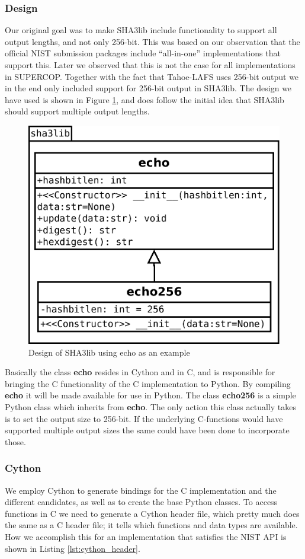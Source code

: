 \documentclass[english,12pt,a4paper]{book}
\begin{document}
\subsubsection{Design}
Our original goal was to make SHA3lib include functionality to support all
output lengths, and not only 256-bit. This was based on our observation that
the official \ac{NIST} submission packages include ``all-in-one''
implementations that support this. Later we observed that this is not the case
for all implementations in \ac{SUPERCOP}. Together with the fact that
Tahoe-\ac{LAFS} uses 256-bit output we in the end only included support for
256-bit output in SHA3lib. The design we have used is shown in Figure
\ref{fig:python:inheritance}, and does follow the initial idea that SHA3lib
should support multiple output lengths.

\begin{figure}[h!]
    \centering
    \includegraphics[width=0.6\columnwidth]{python-inheritance.pdf}
    \caption{Design of SHA3lib using echo as an example}
    \label{fig:python:inheritance}
\end{figure}

Basically the class \textbf{echo} resides in Cython and in C, and is responsible
for bringing the C functionality of the C implementation to Python. By compiling
\textbf{echo} it will be made available for use in Python.  The class
\textbf{echo256} is a simple Python class which inherits from \textbf{echo}. The
only action this class actually takes is to set the output size to 256-bit. If
the underlying C-functions would have supported multiple output sizes the same
could have been done to incorporate those.

\subsubsection{Cython}
We employ Cython to generate bindings for the C implementation and the
different candidates, as well as to create the base Python classes. To access
functions in C we need to generate a Cython header file, which pretty much does
the same as a C header file; it tells which functions and data types are
available. How we accomplish this for an implementation that satisfies the
\ac{NIST} \ac{API} is shown in Listing \ref{lst:cython_header}.
\end{document}
